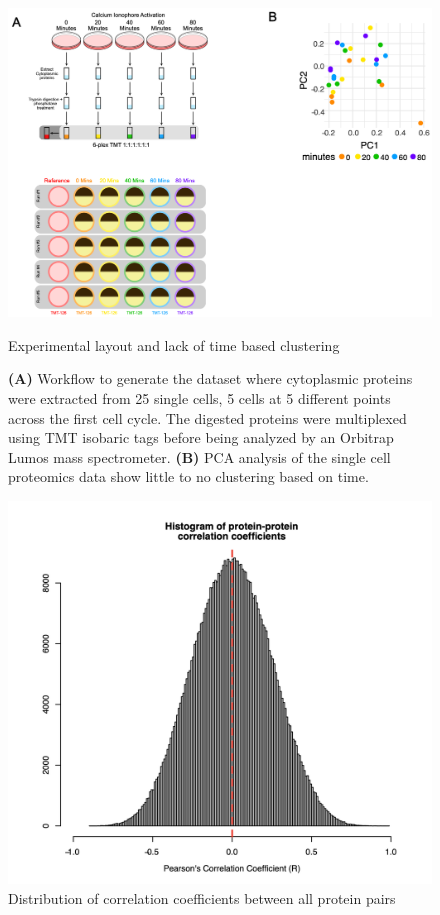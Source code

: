 \beginsupplement


\begin{figure}[hbt!]
\centering
\includegraphics[width=14cm, keepaspectratio]{figs/paper2/figS1.png}
\caption{Experimental layout and lack of time based clustering}
\caption*{\textbf{(A)} Workflow to generate the dataset where cytoplasmic proteins were extracted from 25 single cells, 5 cells at 5 different points across the first cell cycle. The digested proteins were multiplexed using TMT isobaric tags before being analyzed by an Orbitrap Lumos mass spectrometer. \textbf{(B)} PCA analysis of the single cell proteomics data show little to no clustering based on time.}
\label{fig:paper2_figS1}
\end{figure}

\begin{figure}[hbt!]
\centering
\includegraphics[width=14cm, keepaspectratio]{figs/paper2/figS2.png}
\caption{Distribution of correlation coefficients between all protein pairs}
\label{fig:paper2_figS2}
\end{figure}